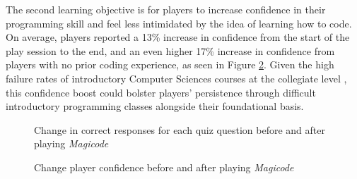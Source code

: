 \documentclass[10pt,twocolumn]{article}
\begin{document}
The second learning objective is for players to increase confidence in their programming skill and feel less intimidated by the idea of learning how to code. On average, players reported a 13\% increase in confidence from the start of the play session to the end, and an even higher 17\% increase in confidence from players with no prior coding experience, as seen in Figure \ref{confidence-graph}. Given the high failure rates of introductory Computer Sciences courses at the collegiate level \cite{failure-rates}, this confidence boost could bolster players’ persistence through difficult introductory programming classes alongside their foundational basis.


\begin{figure}
    \caption{Change in correct responses for each quiz question before and after playing \textit{Magicode}}
    \label{quiz-score-graph}
\end{figure}
\begin{figure}
    \caption{Change player confidence before and after playing  \textit{Magicode}}
    \label{confidence-graph}
\end{figure}
\end{document}
